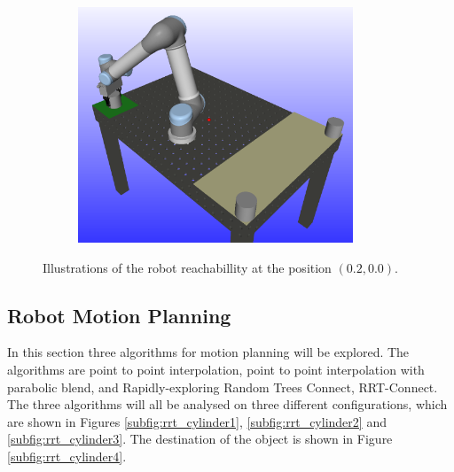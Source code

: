 \documentclass[../main.tex]{subfiles}
\begin{document}
\begin{figure}[H]
\begin{subfigure}{0.329\textwidth}
        \includegraphics[width=0.9\textwidth]{figures/workcell_setup/final_robot_position3.png}
    \end{subfigure}
    \caption{Illustrations of the robot reachabillity at the position $(0.2, 0.0)$.}
    \label{fig:final_robot_position}
\end{figure}

\subsection{Robot Motion Planning} \label{subsec:robot_motion_planning}
In this section three algorithms for motion planning will be explored. The algorithms are point to point interpolation, point to point interpolation with parabolic blend, and Rapidly-exploring Random Trees Connect, RRT-Connect. The three algorithms will all be analysed on three different configurations, which are shown in Figures \ref{subfig:rrt_cylinder1}, \ref{subfig:rrt_cylinder2} and \ref{subfig:rrt_cylinder3}. The destination of the object is shown in Figure \ref{subfig:rrt_cylinder4}.
\end{document}
